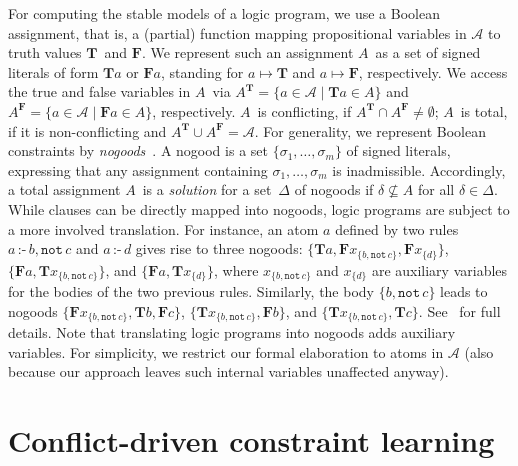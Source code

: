 \documentclass[letterpaper]{article}
\newcommand{\naf}[1]{\ensuremath{{\mathtt{not}\,{#1}}}} %
\newcommand{\true}{\ensuremath{\boldsymbol{T}}}
\newcommand{\false}{\ensuremath{\boldsymbol{F}}}
\newcommand{\Tsigned}[1]{\ensuremath{\true{#1}}}\message{ *** RENAME *** }
\newcommand{\Fsigned}[1]{\ensuremath{\false{#1}}}
\newcommand{\ass}{\ensuremath{A}}
\newcommand{\tlits}[1]{\ensuremath{{#1}^{\true}}}
\newcommand{\flits}[1]{\ensuremath{{#1}^{\false}}}
\begin{document}
For computing the stable models of a logic program, we use
a Boolean assignment, that is, a (partial) function mapping propositional variables in $\mathcal{A}$
to truth values \true\ and \false.
We represent such an assignment \ass\ as a set of signed literals of form $\Tsigned{a}$ or $\Fsigned{a}$,
standing for $a\mapsto\true$ and $a\mapsto\false$, respectively.
%
We access the true and false variables in \ass\ via
\(
\tlits{\ass}
=
\{a\in\mathcal{A}\mid\Tsigned{a}\in\ass\}
\)
and
\(
\flits{\ass}
=
\{a\in\mathcal{A}\mid\Fsigned{a}\in \ass\}
\), respectively.
%
\ass\ is conflicting, if $\tlits{\ass}\cap\flits{\ass}\neq\emptyset$;
\ass\ is total, if it is non-conflicting and $\tlits{\ass}\cup\flits{\ass}=\mathcal{A}$.
%
For generality, we represent Boolean constraints by \emph{nogoods}~\cite{dechter03}.
A nogood is a set $\{\sigma_1,\dots,\sigma_m\}$ of signed literals,
expressing that any assignment containing $\sigma_1,\dots,\sigma_m$ is inadmissible.
Accordingly,
a total assignment \ass\ is a \emph{solution} for a set~$\Delta$ of nogoods
if $\delta\not\subseteq\ass$ for all $\delta\in\Delta$.
%
While clauses can be directly mapped into nogoods,
logic programs are subject to a more involved translation.
For instance, 
an atom $a$ defined by two rules $a\,\texttt{:-}\,b,\naf{c}$ and $a\,\texttt{:-}\,d$
gives rise to three nogoods:
$\{\Tsigned{a},\Fsigned{x_{\{b,\naf{c}\}}},\Fsigned{x_{\{d\}}}\}$,
$\{\Fsigned{a},\Tsigned{x_{\{b,\naf{c}\}}}\}$, and
$\{\Fsigned{a},\Tsigned{x_{\{d\}}}\}$,
where $x_{\{b,\naf{c}\}}$ and $x_{\{d\}}$ are auxiliary variables for the bodies of the two previous rules.
Similarly, the body ${\{b,\naf{c}\}}$ leads to nogoods
$\{\Fsigned{x_{\{b,\naf{c}\}}},\Tsigned{b},\Fsigned{c}\}$,
$\{\Tsigned{x_{\{b,\naf{c}\}}},\Fsigned{b}\}$, and
$\{\Tsigned{x_{\{b,\naf{c}\}}},\Tsigned{c}\}$.
See~\cite{gekakasc12a} for full details.
%
Note that translating logic programs into nogoods adds auxiliary variables.
For simplicity, we restrict our formal elaboration to atoms in $\mathcal{A}$
(also because our approach leaves such internal variables unaffected anyway).





\section{Conflict-driven constraint learning}\label{sec:cdcl}
\end{document}
